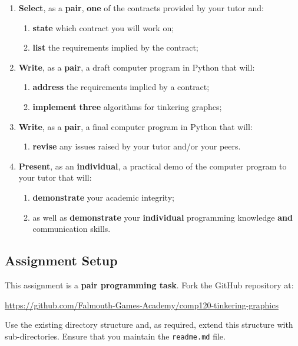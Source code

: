 \documentclass{../fal_assignment}
\begin{document}
\begin{enumerate}[label=(\Alph*)]
    \item \textbf{Select}, as a \textbf{pair}, \textbf{one} of the contracts provided by your tutor and:
    	\begin{enumerate}[label=\roman*.]
    		\item \textbf{state} which contract you will work on;
    		\item \textbf{list} the requirements implied by the contract;
	\end{enumerate}
    \item \textbf{Write}, as a \textbf{pair}, a draft computer program in Python that will:
    	\begin{enumerate}[label=\roman*.]
    		\item \textbf{address} the requirements implied by a contract;
    		\item \textbf{implement} \textbf{three} algorithms for tinkering graphcs;
	\end{enumerate}
    \item \textbf{Write}, as a \textbf{pair}, a final computer program in Python that will:
    	\begin{enumerate}[label=\roman*.]
    		\item \textbf{revise} any issues raised by your tutor and/or your peers.
	\end{enumerate}
    \item \textbf{Present}, as an \textbf{individual}, a practical demo of the computer program to your tutor that will:
    	\begin{enumerate}[label=\roman*.]
    		\item \textbf{demonstrate} your academic integrity;
    		\item as well as \textbf{demonstrate} your \textbf{individual} programming knowledge \textbf{and} communication skills.
	\end{enumerate}
\end{enumerate}

\subsection*{Assignment Setup}

This assignment is a \textbf{pair programming task}. Fork the GitHub repository at:

\indent \url{https://github.com/Falmouth-Games-Academy/comp120-tinkering-graphics}

Use the existing directory structure and, as required, extend this structure with sub-directories. Ensure that you maintain the \texttt{readme.md} file.
\end{document}
